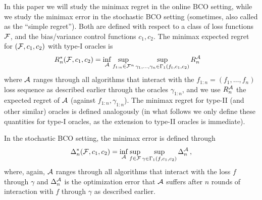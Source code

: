 In this paper we will study the minimax regret in the online BCO setting, while we study the minimax error in the stochastic BCO setting (sometimes, also called as the ``simple regret'').
Both are defined with respect to a class of loss functions $\mathcal{F}$, and the bias/variance control functions $c_1,c_2$.
The minimax expected regret for $(\mathcal{F},c_1,c_2)$ with type-I oracles is
\begin{align*}
R_n^*(\cF,c_1,c_2)
&= \inf_{\cA} \sup_{f_{1:n}\in \cF^n}
	\sup_{\substack{\gamma_1,\ldots,\gamma_n \in \Gamma_1(f_t,c_1,c_2)%
	}} R_n^{\cA} %
\end{align*}
where $\mathcal{A}$ ranges through all algorithms that interact with the $f_{1:n}= (f_1,\dots,f_n)$ loss sequence
as described earlier
through the oracles $\gamma_{1:n}$,
and we use $R_n^{\mathcal{A}}$ the expected regret of $\mathcal{A}$ (against $f_{1:n},\gamma_{1:n}$).
The minimax regret for type-II (and other similar) oracles is defined analogously (in what follows we only define these quantities for type-I oracles, as the extension to type-II oracles is immediate).

In the stochastic BCO setting, the minimax error is defined through
\begin{align*}
\Delta_n^*(\cF,c_1,c_2)
= \inf_{\cA} \sup_{f \in \cF} \sup_{\gamma\in \Gamma_1(f,c_1,c_2)}  \Delta_n^{\cA}\,, %
\end{align*}
where, again, $\mathcal{A}$ ranges through all algorithms that interact with the loss $f$ through $\gamma$ and
$\Delta_n^{\mathcal{A}}$ is the optimization error that $\mathcal{A}$ suffers
after $n$ rounds of interaction with $f$ through $\gamma$ as described earlier.

